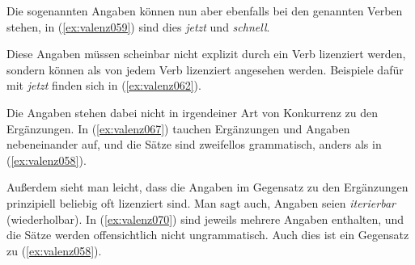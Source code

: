 \begin{exe}
  \ex\label{ex:valenz058}
  \begin{xlist}
  \end{xlist}
\end{exe}

Die sogenannten Angaben können nun aber ebenfalls bei den genannten Verben stehen, in (\ref{ex:valenz059}) sind dies \textit{jetzt} und \textit{schnell}.

\begin{exe}
  \ex\label{ex:valenz059}
  \begin{xlist}
  \end{xlist}
\end{exe}

Diese Angaben müssen scheinbar nicht explizit durch ein Verb lizenziert werden, sondern können als von jedem Verb lizenziert angesehen werden.
Beispiele dafür mit \textit{jetzt} finden sich in (\ref{ex:valenz062}).

\begin{exe}
  \ex\label{ex:valenz062}
  \begin{xlist}
  \end{xlist}
\end{exe}

Die Angaben stehen dabei nicht in irgendeiner Art von Konkurrenz zu den Ergänzungen.
In (\ref{ex:valenz067}) tauchen Ergänzungen und Angaben nebeneinander auf, und die Sätze sind zweifellos grammatisch, anders als in (\ref{ex:valenz058}).

\begin{exe}
  \ex\label{ex:valenz067}
  \begin{xlist}
  \end{xlist}
\end{exe}

Außerdem sieht man leicht, dass die Angaben im Gegensatz zu den Ergänzungen prinzipiell beliebig oft lizenziert sind.
Man sagt auch, Angaben seien \textit{iterierbar} (wiederholbar).
%
In (\ref{ex:valenz070}) sind jeweils mehrere Angaben enthalten, und die Sätze werden offensichtlich nicht ungrammatisch.
Auch dies ist ein Gegensatz zu (\ref{ex:valenz058}).

